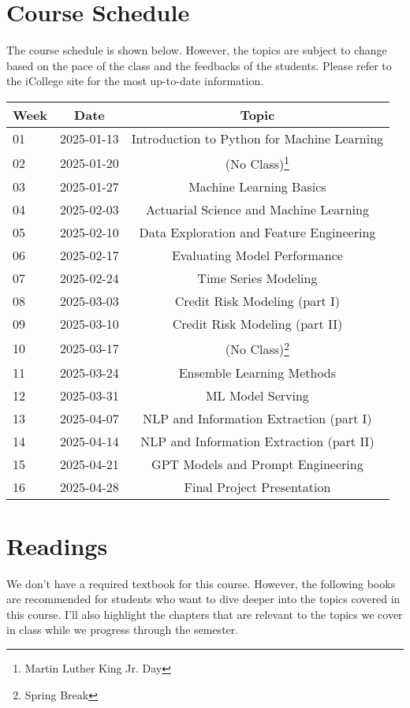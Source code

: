 \documentclass[a4paper, 12pt]{article}
\begin{document}
\section{Course Schedule}
The course schedule is shown below. However, the topics are subject to change based on the pace of the class and the feedbacks of the students. Please refer to the iCollege site for the most up-to-date information.

\begin{center}
    \begin{tabular}{ l | c | c }
        \hline			
        Week & Date & Topic\\
        \hline
        01 & 2025-01-13 & Introduction to Python for Machine Learning\\
        02 & 2025-01-20 & (No Class)\footnote{Martin Luther King Jr. Day}\\
        03 & 2025-01-27 & Machine Learning Basics\\
        04 & 2025-02-03 & Actuarial Science and Machine Learning\\
        05 & 2025-02-10 & Data Exploration and Feature Engineering\\
        06 & 2025-02-17 & Evaluating Model Performance\\
        07 & 2025-02-24 & Time Series Modeling\\
        08 & 2025-03-03 & Credit Risk Modeling (part I)\\
        09 & 2025-03-10 & Credit Risk Modeling (part II)\\
        10 & 2025-03-17 & (No Class)\footnote{Spring Break}\\
        11 & 2025-03-24 & Ensemble Learning Methods\\
        12 & 2025-03-31 & ML Model Serving\\
        13 & 2025-04-07 & NLP and Information Extraction (part I)\\
        14 & 2025-04-14 & NLP and Information Extraction (part II)\\
        15 & 2025-04-21 & GPT Models and Prompt Engineering\\
        16 & 2025-04-28 & Final Project Presentation\\
        \hline  
    \end{tabular}
\end{center}

\section{Readings}
We don't have a required textbook for this course. However, the following books are recommended for students who want to dive deeper into the topics covered in this course. I'll also highlight the chapters that are relevant to the topics we cover in class while we progress through the semester.
\end{document}
